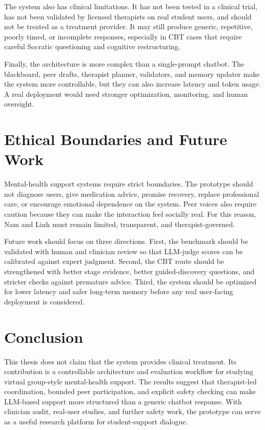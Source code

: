 The system also has clinical limitations. It has not been tested in a clinical trial, has not been validated by licensed therapists on real student users, and should not be treated as a treatment provider. It may still produce generic, repetitive, poorly timed, or incomplete responses, especially in CBT cases that require careful Socratic questioning and cognitive restructuring.

Finally, the architecture is more complex than a single-prompt chatbot. The blackboard, peer drafts, therapist planner, validators, and memory updater make the system more controllable, but they can also increase latency and token usage. A real deployment would need stronger optimization, monitoring, and human oversight.

\section{Ethical Boundaries and Future Work}

Mental-health support systems require strict boundaries. The prototype should not diagnose users, give medication advice, promise recovery, replace professional care, or encourage emotional dependence on the system. Peer voices also require caution because they can make the interaction feel socially real. For this reason, Nam and Linh must remain limited, transparent, and therapist-governed.

Future work should focus on three directions. First, the benchmark should be validated with human and clinician review so that LLM-judge scores can be calibrated against expert judgment. Second, the CBT route should be strengthened with better stage evidence, better guided-discovery questions, and stricter checks against premature advice. Third, the system should be optimized for lower latency and safer long-term memory before any real user-facing deployment is considered.

\section{Conclusion}

This thesis does not claim that the system provides clinical treatment. Its contribution is a controllable architecture and evaluation workflow for studying virtual group-style mental-health support. The results suggest that therapist-led coordination, bounded peer participation, and explicit safety checking can make LLM-based support more structured than a generic chatbot response. With clinician audit, real-user studies, and further safety work, the prototype can serve as a useful research platform for student-support dialogue.
